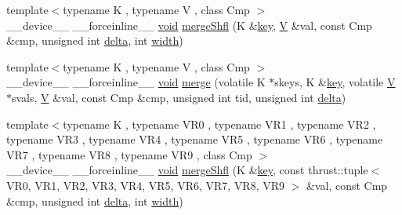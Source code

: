\begin{DoxyCompactItemize}
\item 
{\footnotesize template$<$typename K , typename V , class Cmp $>$ }\\\-\_\-\-\_\-device\-\_\-\-\_\- \-\_\-\-\_\-forceinline\-\_\-\-\_\- \hyperlink{legacy_8hpp_a8bb47f092d473522721002c86c13b94e}{void} \hyperlink{namespacecv_1_1gpu_1_1device_1_1reduce__key__val__detail_aaef6abf3d0a904c43b8e28c4a8ca3c70}{merge\-Shfl} (K \&\hyperlink{core__c_8h_a68cf695b604d08c0b6f6f6bb282a6586}{key}, \hyperlink{core__c_8h_ad8dd4fff0e3910932187b6de0543cae1}{V} \&val, const Cmp \&cmp, unsigned int \hyperlink{legacy_8hpp_ac867054f00f4be8b1f3ebce6fba31982}{delta}, int \hyperlink{highgui__c_8h_a2474a5474cbff19523a51eb1de01cda4}{width})
\item 
{\footnotesize template$<$typename K , typename V , class Cmp $>$ }\\\-\_\-\-\_\-device\-\_\-\-\_\- \-\_\-\-\_\-forceinline\-\_\-\-\_\- \hyperlink{legacy_8hpp_a8bb47f092d473522721002c86c13b94e}{void} \hyperlink{namespacecv_1_1gpu_1_1device_1_1reduce__key__val__detail_a1348c5a366b58a8f0331c2379f05cbb0}{merge} (volatile K $\ast$skeys, K \&\hyperlink{core__c_8h_a68cf695b604d08c0b6f6f6bb282a6586}{key}, volatile \hyperlink{core__c_8h_ad8dd4fff0e3910932187b6de0543cae1}{V} $\ast$svals, \hyperlink{core__c_8h_ad8dd4fff0e3910932187b6de0543cae1}{V} \&val, const Cmp \&cmp, unsigned int tid, unsigned int \hyperlink{legacy_8hpp_ac867054f00f4be8b1f3ebce6fba31982}{delta})
\item 
{\footnotesize template$<$typename K , typename V\-R0 , typename V\-R1 , typename V\-R2 , typename V\-R3 , typename V\-R4 , typename V\-R5 , typename V\-R6 , typename V\-R7 , typename V\-R8 , typename V\-R9 , class Cmp $>$ }\\\-\_\-\-\_\-device\-\_\-\-\_\- \-\_\-\-\_\-forceinline\-\_\-\-\_\- \hyperlink{legacy_8hpp_a8bb47f092d473522721002c86c13b94e}{void} \hyperlink{namespacecv_1_1gpu_1_1device_1_1reduce__key__val__detail_af38ca933599223b41deaedd27732924c}{merge\-Shfl} (K \&\hyperlink{core__c_8h_a68cf695b604d08c0b6f6f6bb282a6586}{key}, const thrust\-::tuple$<$ V\-R0, V\-R1, V\-R2, V\-R3, V\-R4, V\-R5, V\-R6, V\-R7, V\-R8, V\-R9 $>$ \&val, const Cmp \&cmp, unsigned int \hyperlink{legacy_8hpp_ac867054f00f4be8b1f3ebce6fba31982}{delta}, int \hyperlink{highgui__c_8h_a2474a5474cbff19523a51eb1de01cda4}{width})
\item 

\end{DoxyCompactItemize}
